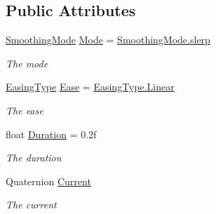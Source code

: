 \subsection*{Public Attributes}
\begin{DoxyCompactItemize}
\item 
\hyperlink{namespace_radical_library_a53ca8c4ff40f917ad8d03bb2c0dbd548}{Smoothing\+Mode} \hyperlink{class_radical_library_1_1_smooth_quaternion_ace7603e6500795d9d9334787f03a730c}{Mode} = \hyperlink{namespace_radical_library_a53ca8c4ff40f917ad8d03bb2c0dbd548ab3e5b7b54ffda84cdd1cfffb503170be}{Smoothing\+Mode.\+slerp}
\begin{DoxyCompactList}\small\item\em The mode \end{DoxyCompactList}\item 
\hyperlink{namespace_radical_library_a2d6877adaf2ec492cf30c572aa684e6f}{Easing\+Type} \hyperlink{class_radical_library_1_1_smooth_quaternion_abcd64e7ee93afd9bba94a7cff0a30c44}{Ease} = \hyperlink{namespace_radical_library_a2d6877adaf2ec492cf30c572aa684e6fa32a843da6ea40ab3b17a3421ccdf671b}{Easing\+Type.\+Linear}
\begin{DoxyCompactList}\small\item\em The ease \end{DoxyCompactList}\item 
float \hyperlink{class_radical_library_1_1_smooth_quaternion_ad259915700a8735a90461729e85f27c4}{Duration} = 0.\+2f
\begin{DoxyCompactList}\small\item\em The duration \end{DoxyCompactList}\item 
Quaternion \hyperlink{class_radical_library_1_1_smooth_quaternion_ad699403357ee442582c0e60ac9ba4a18}{Current}
\begin{DoxyCompactList}\small\item\em The current \end{DoxyCompactList}\end{DoxyCompactItemize}
